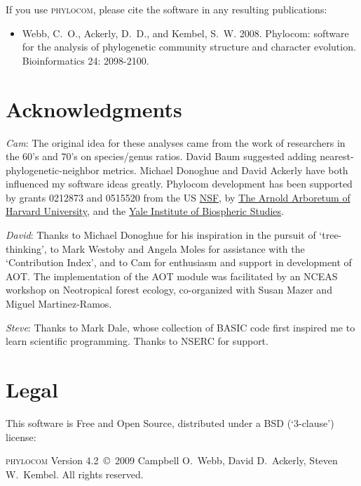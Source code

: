 \documentclass[12pt,letterpaper]{article}
\newcommand{\phylocomversion}{4.2}
\begin{document}
If you use {\scshape phylocom}, please cite the software in any resulting publications:

\begin{raggedright}
\begin{itemize}
 \item[] Webb, C.\ O., Ackerly, D.\ D., and Kembel, S.\ W. 2008. Phylocom: software for the analysis of
phylogenetic community structure and character evolution. Bioinformatics 24: 2098-2100.
\end{itemize}
\end{raggedright}


\section{Acknowledgments}

\textit{Cam}: The original idea for these analyses came from the work
of researchers in the 60's and 70's on species/genus ratios. David
Baum suggested adding nearest-phylogenetic-neighbor metrics. Michael
Donoghue and David Ackerly have both influenced my software ideas
greatly.  Phylocom development has been supported by grants 0212873
and 0515520 from the US \href{http://www.nsf.gov/}{NSF},
by \href{http://www.arboretum.harvard.edu/}{The Arnold Arboretum of Harvard
  University}, and the
\href{http://www.yale.edu/yibs/}{Yale Institute of Biospheric
  Studies}.


\bigskip \noindent \textit{David}: Thanks to Michael Donoghue for his
inspiration in the pursuit of `tree-thinking', to Mark Westoby and
Angela Moles for assistance with the `Contribution Index', and to Cam
for enthusiasm and support in development of AOT. The implementation
of the AOT module was facilitated by an NCEAS workshop on Neotropical
forest ecology, co-organized with Susan Mazer and Miguel
Martinez-Ramos.

\bigskip \noindent \textit{Steve}: Thanks to Mark Dale, whose collection of BASIC code
first inspired me to learn scientific programming. Thanks to NSERC for support.

\section{Legal}

This software is Free and Open Source, distributed under a BSD
(`3-clause') license:

{\scshape phylocom} Version \phylocomversion~\copyright~2009 Campbell
O.\ Webb, David D.\ Ackerly, Steven W.\ Kembel. All rights reserved.
\end{document}
